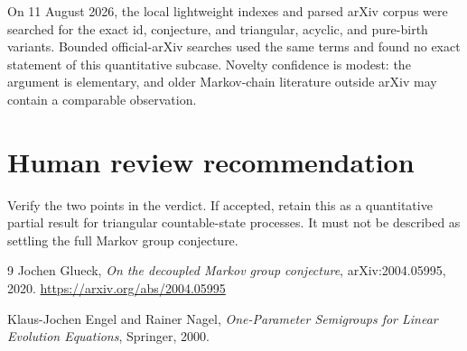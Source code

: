\documentclass[11pt]{article}
\begin{document}
On 11 August 2026, the local lightweight indexes and parsed arXiv corpus were
searched for the exact id, conjecture, and triangular, acyclic, and pure-birth
variants. Bounded official-arXiv searches used the same terms and found no
exact statement of this quantitative subcase. Novelty confidence is modest:
the argument is elementary, and older Markov-chain literature outside arXiv
may contain a comparable observation.

\section{Human review recommendation}

Verify the two points in the verdict. If accepted, retain this as a
quantitative partial result for triangular countable-state processes. It must
not be described as settling the full Markov group conjecture.

\begin{thebibliography}{9}
Jochen Glueck,
\emph{On the decoupled Markov group conjecture},
arXiv:2004.05995, 2020.
\url{https://arxiv.org/abs/2004.05995}

Klaus-Jochen Engel and Rainer Nagel,
\emph{One-Parameter Semigroups for Linear Evolution Equations},
Springer, 2000.
\end{thebibliography}
\end{document}
